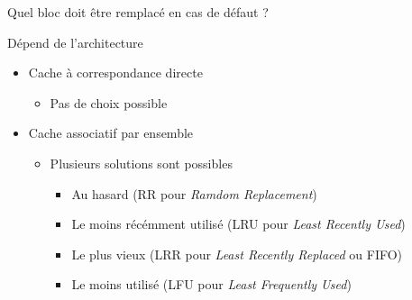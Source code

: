 %
\begin{Frame}{Quel bloc doit être remplacé en cas de défaut ?}


      \begin{block}{Dépend de l'architecture}
        \begin{itemize}
        \item Cache à correspondance directe

		\begin{itemize}
        		\item Pas de choix possible
		\end{itemize}

	\item Cache associatif par ensemble 

		\begin{itemize}
        		\item Plusieurs solutions sont possibles

				\begin{itemize}
        				\item Au hasard (RR pour \emph{Ramdom Replacement})	
					\item Le moins récémment utilisé (LRU pour \emph{Least Recently Used})
					\item Le plus vieux (LRR pour \emph{Least Recently Replaced} ou FIFO)
					\item Le moins utilisé (LFU pour \emph{Least Frequently Used})
				\end{itemize}

		\end{itemize}

        \end{itemize}
      \end{block} 

      
\end{Frame}



